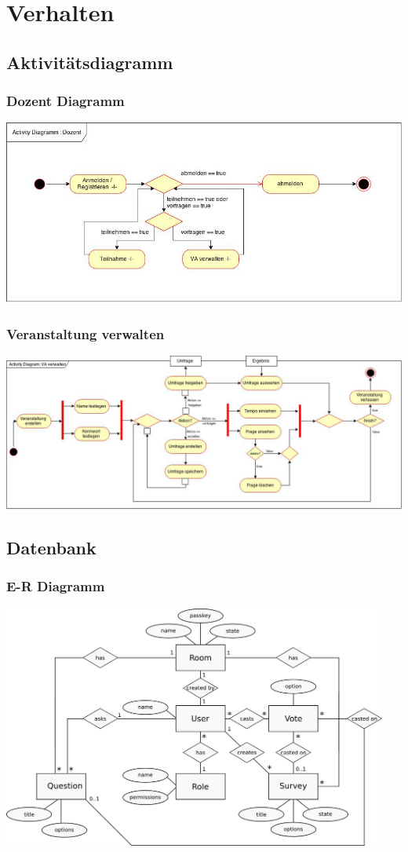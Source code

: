 \documentclass[german,a4paper]{beamer}
\begin{document}
\section{Verhalten}
\subsection{Aktivit\"{a}tsdiagramm}

\begin{frame}
\frametitle{Dozent Diagramm}
\includegraphics[width=1.0\textwidth]{./diagrams/activity/AD_MainDozent.jpg}
\end{frame}

\begin{frame}
\frametitle{Veranstaltung verwalten}
\includegraphics[width=1.0\textwidth]{./diagrams/activity/ad_SubVeranstaltungVerwalten.jpg}
\end{frame}

\subsection{Datenbank}
\begin{frame}
\frametitle{E-R Diagramm}
\includegraphics[width=0.95\textwidth]{./diagrams/er/er_diagram.png}
\end{frame}
\end{document}
